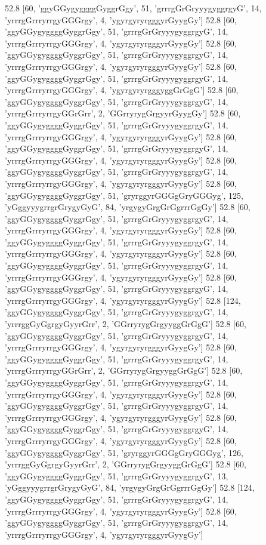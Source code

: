 52.8 [60, 'ggyGGygyggggGyggrGgy', 51, 'grrrgGrGryyygyggrgyG', 14, 'yrrrgGrrryrrgyGGGrgy', 4, 'ygyrgyryrgggyrGyygGy']
52.8 [60, 'ggyGGygyggggGyggrGgy', 51, 'grrrgGrGryyygyggrgyG', 14, 'yrrrgGrrryrrgyGGGrgy', 4, 'ygyrgyryrgggyrGyygGy']
52.8 [60, 'ggyGGygyggggGyggrGgy', 51, 'grrrgGrGryyygyggrgyG', 14, 'yrrrgGrrryrrgyGGGrgy', 4, 'ygyrgyryrgggyrGyygGy']
52.8 [60, 'ggyGGygyggggGyggrGgy', 51, 'grrrgGrGryyygyggrgyG', 14, 'yrrrgGrrryrrgyGGGrgy', 4, 'ygyrgyryrgggyggGrGgG']
52.8 [60, 'ggyGGygyggggGyggrGgy', 51, 'grrrgGrGryyygyggrgyG', 14, 'yrrrgGrrryrrgyGGrGrr', 2, 'GGrryrygGrgyyrGyygGy']
52.8 [60, 'ggyGGygyggggGyggrGgy', 51, 'grrrgGrGryyygyggrgyG', 14, 'yrrrgGrrryrrgyGGGrgy', 4, 'ygyrgyryrgggyrGyygGy']
52.8 [60, 'ggyGGygyggggGyggrGgy', 51, 'grrrgGrGryyygyggrgyG', 14, 'yrrrgGrrryrrgyGGGrgy', 4, 'ygyrgyryrgggyrGyygGy']
52.8 [60, 'ggyGGygyggggGyggrGgy', 51, 'grrrgGrGryyygyggrgyG', 14, 'yrrrgGrrryrrgyGGGrgy', 4, 'ygyrgyryrgggyrGyygGy']
52.8 [60, 'ggyGGygyggggGyggrGgy', 51, 'gryrggyrGGGgGryGGGyg', 125, 'yGggyyygrrgrGrygyGyG', 84, 'yrgygyGrgGrGgrrrGgGy']
52.8 [60, 'ggyGGygyggggGyggrGgy', 51, 'grrrgGrGryyygyggrgyG', 14, 'yrrrgGrrryrrgyGGGrgy', 4, 'ygyrgyryrgggyrGyygGy']
52.8 [60, 'ggyGGygyggggGyggrGgy', 51, 'grrrgGrGryyygyggrgyG', 14, 'yrrrgGrrryrrgyGGGrgy', 4, 'ygyrgyryrgggyrGyygGy']
52.8 [60, 'ggyGGygyggggGyggrGgy', 51, 'grrrgGrGryyygyggrgyG', 14, 'yrrrgGrrryrrgyGGGrgy', 4, 'ygyrgyryrgggyrGyygGy']
52.8 [60, 'ggyGGygyggggGyggrGgy', 51, 'grrrgGrGryyygyggrgyG', 14, 'yrrrgGrrryrrgyGGGrgy', 4, 'ygyrgyryrgggyrGyygGy']
52.8 [124, 'ggyGGygyggggGyggrGgy', 51, 'grrrgGrGryyygyggrgyG', 14, 'yrrrggGyGgrgyGyyrGrr', 2, 'GGrryrygGrgyyggGrGgG']
52.8 [60, 'ggyGGygyggggGyggrGgy', 51, 'grrrgGrGryyygyggrgyG', 14, 'yrrrgGrrryrrgyGGGrgy', 4, 'ygyrgyryrgggyrGyygGy']
52.8 [60, 'ggyGGygyggggGyggrGgy', 51, 'grrrgGrGryyygyggrgyG', 14, 'yrrrgGrrryrrgyGGrGrr', 2, 'GGrryrygGrgyyggGrGgG']
52.8 [60, 'ggyGGygyggggGyggrGgy', 51, 'grrrgGrGryyygyggrgyG', 14, 'yrrrgGrrryrrgyGGGrgy', 4, 'ygyrgyryrgggyrGyygGy']
52.8 [60, 'ggyGGygyggggGyggrGgy', 51, 'grrrgGrGryyygyggrgyG', 14, 'yrrrgGrrryrrgyGGGrgy', 4, 'ygyrgyryrgggyrGyygGy']
52.8 [60, 'ggyGGygyggggGyggrGgy', 51, 'grrrgGrGryyygyggrgyG', 14, 'yrrrgGrrryrrgyGGGrgy', 4, 'ygyrgyryrgggyrGyygGy']
52.8 [60, 'ggyGGygyggggGyggrGgy', 51, 'gryrggyrGGGgGryGGGyg', 126, 'yrrrggGyGgrgyGyyrGrr', 2, 'GGrryrygGrgyyggGrGgG']
52.8 [60, 'ggyGGygyggggGyggrGgy', 51, 'grrrgGrGryyygyggrgyG', 13, 'yGggyyygrrgrGrygyGyG', 84, 'yrgygyGrgGrGgrrrGgGy']
52.8 [124, 'ggyGGygyggggGyggrGgy', 51, 'grrrgGrGryyygyggrgyG', 14, 'yrrrgGrrryrrgyGGGrgy', 4, 'ygyrgyryrgggyrGyygGy']
52.8 [60, 'ggyGGygyggggGyggrGgy', 51, 'grrrgGrGryyygyggrgyG', 14, 'yrrrgGrrryrrgyGGGrgy', 4, 'ygyrgyryrgggyrGyygGy']
